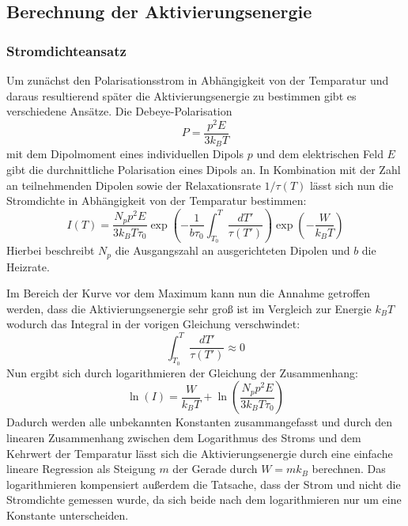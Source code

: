 \subsection{Berechnung der Aktivierungsenergie}
\subsubsection{Stromdichteansatz}
Um zunächst den Polarisationsstrom in Abhängigkeit von der Temparatur und daraus resultierend später die Aktivierungsenergie zu bestimmen gibt es verschiedene Ansätze. Die Debeye-Polarisation
\begin{equation*}
P=\frac{p^2E}{3k_BT}
\end{equation*}
mit dem Dipolmoment eines individuellen Dipols $p$ und dem elektrischen Feld $E$ gibt die durchnittliche Polarisation eines Dipols an. In Kombination mit der Zahl an teilnehmenden Dipolen sowie der Relaxationsrate $1/\tau(T)$ lässt sich nun die Stromdichte in Abhängigkeit von der Temparatur bestimmen:
\begin{equation}
I(T)=\frac{N_pp^2E}{3k_BT\tau_0}\exp \left( -\frac{1}{b\tau_0}\int^{T}_{T_0} \frac{dT'}{\tau(T')}\right)\exp\left(-\frac{W}{k_BT}\right)
\label{eq:IStromdichteansatz}
\end{equation}
Hierbei beschreibt $N_p$ die Ausgangszahl an ausgerichteten Dipolen und $b$ die Heizrate. 

Im Bereich der Kurve vor dem Maximum kann nun die Annahme getroffen werden, dass die Aktivierungsenergie sehr groß ist im Vergleich zur Energie $k_BT$ wodurch das Integral in der vorigen Gleichung verschwindet:
\begin{equation*}
 \int^{T}_{T_0} \frac{dT'}{\tau(T')}\approx 0
\end{equation*}
Nun ergibt sich durch logarithmieren der Gleichung der Zusammenhang:
\begin{equation}
\ln(I)=\frac{W}{k_BT}+\ln\left(\frac{N_pp^2E}{3k_BT\tau_0}\right)
\label{equ:1}
\end{equation}
Dadurch werden alle unbekannten Konstanten zusammangefasst und durch den linearen Zusammenhang zwischen dem Logarithmus des Stroms und dem Kehrwert der Temparatur lässt sich die Aktivierungsenergie durch eine einfache lineare Regression als Steigung $m$ der Gerade durch $W=mk_B$ berechnen. Das logarithmieren kompensiert außerdem die Tatsache, dass der Strom und nicht die Stromdichte gemessen wurde, da sich beide nach dem logarithmieren nur um eine Konstante unterscheiden.
